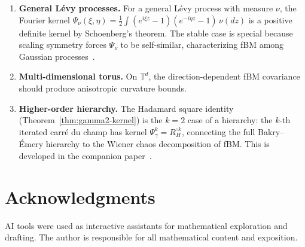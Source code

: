 \documentclass[11pt,a4paper]{article}
\theoremstyle{plain}
\theoremstyle{definition}
\theoremstyle{remark}
\newcommand{\T}{\mathbb{T}}
\begin{document}
\begin{enumerate}[label=(\roman*)]
\item \textbf{General L\'evy processes.}
  For a general L\'evy process with measure $\nu$, the
  Fourier kernel
  $\Psi_\nu(\xi,\eta) = \frac{1}{2}\int (e^{i\xi z}-1)(e^{-i\eta z}-1)\,
  \nu(dz)$ is a positive definite kernel by Schoenberg's theorem.
  The stable case is special because scaling symmetry forces
  $\Psi_\nu$ to be self-similar, characterizing fBM among Gaussian
  processes~\cite{Mishura2008}.

\item \textbf{Multi-dimensional torus.}
  On $\T^d$, the direction-dependent fBM covariance should produce
  anisotropic curvature bounds.

\item \textbf{Higher-order hierarchy.}
  The Hadamard square identity (Theorem~\ref{thm:gamma2-kernel})
  is the $k = 2$ case of a hierarchy:
  the $k$-th iterated carr\'e du champ has kernel $\Psi_\gamma^k
  = R_H^{\circ k}$, connecting the full Bakry--\'Emery hierarchy
  to the Wiener chaos decomposition of fBM.
  This is developed in the companion paper~\cite{Fontes2026c}.
\end{enumerate}


\section*{Acknowledgments}
AI tools were used as interactive assistants for mathematical
exploration and drafting. The author
is responsible for all mathematical content and exposition.
\end{document}
